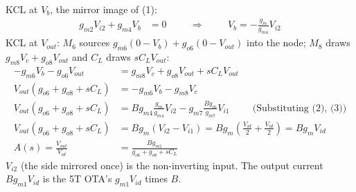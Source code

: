 \begin{enumerate}
\begin{align*}
    \end{align*}
    KCL at \(V_b\), the mirror image of (1):
    \begin{align*}
      g_{m2} V_{i2} + g_{m4} V_b &= 0 \hspace{1cm} \Rightarrow \hspace{1cm} V_b = -\frac{g_m}{g_{m4}} V_{i2} \tag{3}
    \end{align*}
    KCL at \(V_{out}\): \(M_6\) sources \(g_{m6}(0 - V_b) + g_{o6}(0 - V_{out})\) into the
    node; \(M_8\) draws \(g_{m8} V_c + g_{o8} V_{out}\) and \(C_L\) draws \(sC_L V_{out}\):
    \begin{align*}
      -g_{m6} V_b - g_{o6} V_{out} &= g_{m8} V_c + g_{o8} V_{out} + sC_L V_{out} \\
      V_{out}(g_{o6} + g_{o8} + sC_L) &= -g_{m6} V_b - g_{m8} V_c \\
      V_{out}(g_{o6} + g_{o8} + sC_L) &= B g_{m4}\frac{g_m}{g_{m4}} V_{i2} - g_{m7}\frac{B g_m}{g_{m7}} V_{i1} \hspace{1cm} \text{(Substituting (2), (3))} \\
      V_{out}(g_{o6} + g_{o8} + sC_L) &= B g_m (V_{i2} - V_{i1}) = B g_m \left(\frac{V_{id}}{2} + \frac{V_{id}}{2}\right) = B g_m V_{id} \\
      A(s) = \frac{V_{out}}{V_{id}} &= \frac{B g_{m1}}{g_{o6} + g_{o8} + sC_L} \tag{4}
    \end{align*}
    \(V_{i2}\) (the side mirrored once) is the non-inverting input. The output
    current \(B g_{m1} V_{id}\) is the 5T OTA's \(g_{m1} V_{id}\) times \(B\).
\end{enumerate}

